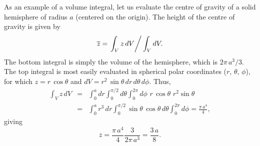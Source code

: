 As an example
of a volume integral, let us evaluate the centre of gravity of a solid hemisphere
of radius $a$ (centered on the origin). 
The height of the centre of gravity is given by
\begin{equation}
\overline{z} = \left. \int_V z\,dV\right/ \int_V dV.
\end{equation}
The bottom integral is simply the volume of the hemisphere, which is $2\pi \,a^3/3$.
The top integral is most easily evaluated in spherical polar coordinates ($r$, $\theta$, $\phi$), for which
$z= r\,\cos\theta$ and $dV = r^2\,\sin\theta\,dr\,d\theta\,d\phi$. Thus,
\begin{eqnarray}
\int_V z\,dV &= &\int_0^a dr\int_0^{\pi/2} d\theta \int_0^{2\pi} d\phi\,\,r\,\cos\theta\,
\,
r^2 \sin\theta\nonumber\\[0.5ex]
&=& \int_0^a r^3\,dr \int_0^{\pi/2} \sin\theta \,\cos\theta\,d\theta \int_0^{2\pi}
d\phi = \frac{\pi \,a^4}{4},
\end{eqnarray}
giving
\begin{equation}
\overline{z} = \frac{ \pi \,a^4}{4}\frac{3}{2\pi \,a^3}= \frac{3\,a}{8}.
\end{equation}

